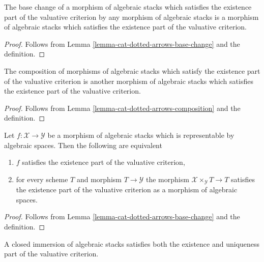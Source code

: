 \begin{lemma}
\label{lemma-base-change-existence}
The base change of a morphism of algebraic stacks which satisfies the
existence part of the valuative criterion by any morphism of
algebraic stacks is a morphism of algebraic stacks which satisfies the
existence part of the valuative criterion.
\end{lemma}

\begin{proof}
Follows from Lemma \ref{lemma-cat-dotted-arrows-base-change}
and the definition.
\end{proof}

\begin{lemma}
\label{lemma-composition-existence}
The composition of morphisms of algebraic stacks which satisfy the
existence part of the valuative criterion is another
morphism of algebraic stacks which satisfies the
existence part of the valuative criterion.
\end{lemma}

\begin{proof}
Follows from Lemma \ref{lemma-cat-dotted-arrows-composition}
and the definition.
\end{proof}

\begin{lemma}
\label{lemma-existence-representable}
Let $f : \mathcal{X} \to \mathcal{Y}$ be a morphism of algebraic stacks
which is representable by algebraic spaces. Then the following are equivalent
\begin{enumerate}
\item $f$ satisfies the existence part of the valuative criterion,
\item for every scheme $T$ and morphism $T \to \mathcal{Y}$
the morphism $\mathcal{X} \times_\mathcal{Y} T \to T$ satisfies
the existence part of the valuative criterion as a morphism
of algebraic spaces.
\end{enumerate}
\end{lemma}

\begin{proof}
Follows from Lemma \ref{lemma-cat-dotted-arrows-base-change}
and the definition.
\end{proof}

\begin{lemma}
\label{lemma-closed-immersion-valuative-criteria}
A closed immersion of algebraic stacks satisfies both
the existence and uniqueness part of the valuative criterion.
\end{lemma}

